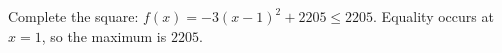 Complete the square: $f(x)=-3(x-1)^2+2205\le2205$. Equality occurs at $x=1$, so the maximum is $\boxed{2205}$.
